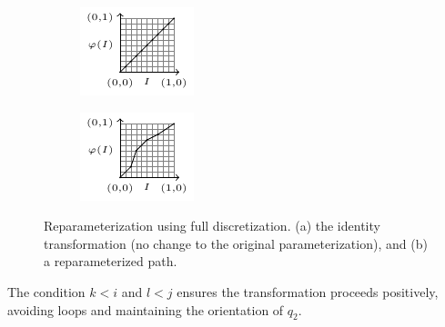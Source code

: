 \begin{figure}[ht]
    \centering
    \begin{subfigure}[b]{0.45\textwidth}
        \includegraphics[width=\textwidth]{figures/dyn-prog-full-disc-id/fig.pdf}
        \caption{}
        \label{fig:dyn-prog-full-disc-id}
    \end{subfigure}
    \hfill
    \begin{subfigure}[b]{0.45\textwidth}
        \includegraphics[width=\textwidth]{figures/dyn-prog-full-disc/fig.pdf}
        \caption{}
        \label{fig:dyn-prog-full-disc}
    \end{subfigure}
    \caption[Reparameterization with Full Discretization]{Reparameterization using full discretization. (a) the identity transformation (no change to the original parameterization), and (b) a reparameterized path.}
    \label{fig:dyn-prog}
\end{figure}

The condition \(k < i\) and \(l < j\) ensures the transformation proceeds positively, avoiding loops and maintaining the orientation of \(q_2\).